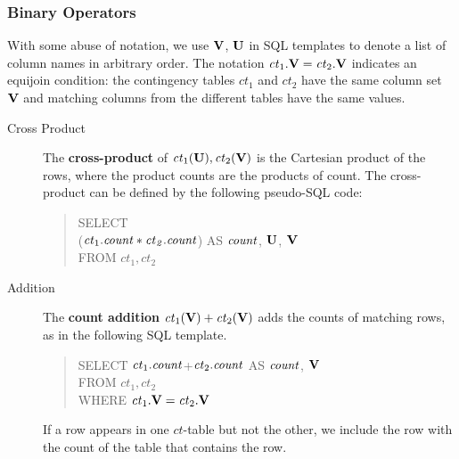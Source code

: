 \documentclass{vldb}
\newcommand{\ct}{\mathit{ct}}
\begin{document}
\subsubsection{Binary Operators} \label{sec:bin}
With some abuse of notation, we use $\mathbf{V}$, $\mathbf{U}$ in SQL templates to denote a list of column names in arbitrary order. The notation $\ct_{1}.\set{V} = \ct_{2}.\set{V}$ indicates an equijoin condition: the contingency tables $\ct_{1}$ and $\ct_{2}$ have the same column set $\mathbf{V}$ and matching columns from the different tables have the same values.
\begin{description}
\item[Cross Product]  %
The \textbf{cross-product} of $\ct_{1}(\set{U}),\ct_{2}(\set{V})$ is the Cartesian product of the rows, where the product counts are the products of count. The cross-product can be defined by the following pseudo-SQL code:
\begin{quote}
SELECT \\($\ct_{1}.\qcount *\ct_{2}.\qcount$) AS $\it{count}$,  $\mathbf{U}$, $\mathbf{V}$\\
FROM  $\ct_{1},\ct_{2}$
\end{quote}


\item[Addition] 
 The \textbf{count addition} $\ct_{1}(\set{V}) + \ct_{2}(\set{V})$ adds the counts of matching rows, as in the following SQL template.
\begin{quote}
SELECT %
$\ct_{1}.\qcount$+$\ct_{2}.\qcount$ AS $\it{count}$, $\mathbf{V}$ \\%
FROM  $\ct_{1},\ct_{2}$\\
WHERE $\ct_{1}.\set{V} = \ct_{2}.\set{V}$
\end{quote}

If a row appears in one $\ct$-table but not the other, we include the row with the count of the table that contains the row. %


\end{description}
\end{document}
